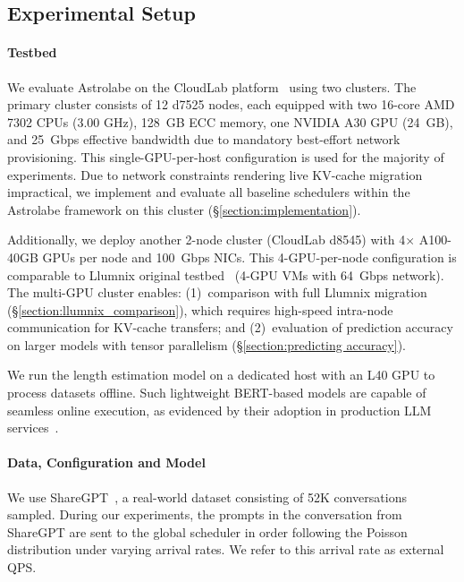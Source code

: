 \documentclass[sigconf, review, anonymous]{acmart}
\begin{document}
\subsection{Experimental Setup} \label{section:experiment_setting}

\paragraph{Testbed} We evaluate Astrolabe on the CloudLab platform~\cite{cloudlab} using two clusters. The primary cluster consists of 12 d7525 nodes, each equipped with two 16-core AMD 7302 CPUs (3.00 GHz), 128~GB ECC memory, one NVIDIA A30 GPU (24~GB), and 25~Gbps effective bandwidth due to mandatory best-effort network provisioning. This single-GPU-per-host configuration is used for the majority of experiments. Due to network constraints rendering live KV-cache migration impractical, we implement and evaluate all baseline schedulers within the Astrolabe framework on this cluster (\S\ref{section:implementation}).

Additionally, we deploy another 2-node cluster (CloudLab d8545) with 4$\times$ A100-40GB GPUs per node and 100~Gbps NICs. This 4-GPU-per-node configuration is comparable to Llumnix original testbed~\cite{sun2024llumnix} (4-GPU VMs with 64~Gbps network). The multi-GPU cluster enables: (1)~comparison with full Llumnix migration (\S\ref{section:llumnix_comparison}), which requires high-speed intra-node communication for KV-cache transfers; and (2)~evaluation of prediction accuracy on larger models with tensor parallelism (\S\ref{section:predicting accuracy}).

We run the length estimation model on a dedicated host with an L40 GPU to process datasets offline. Such lightweight BERT-based models are capable of seamless online execution, as evidenced by their adoption in production LLM services~\cite{wang2025reasonsemanticroutervllm, ong2025routellmlearningroutellms}.

\paragraph{Data, Configuration and Model}

We use ShareGPT~\cite{shareGPTData}, a real-world dataset consisting of 52K conversations sampled.  During our experiments, the prompts in the conversation from ShareGPT are sent to the global scheduler in order following the Poisson distribution under varying arrival rates. We refer to this arrival rate as external QPS.
\end{document}
